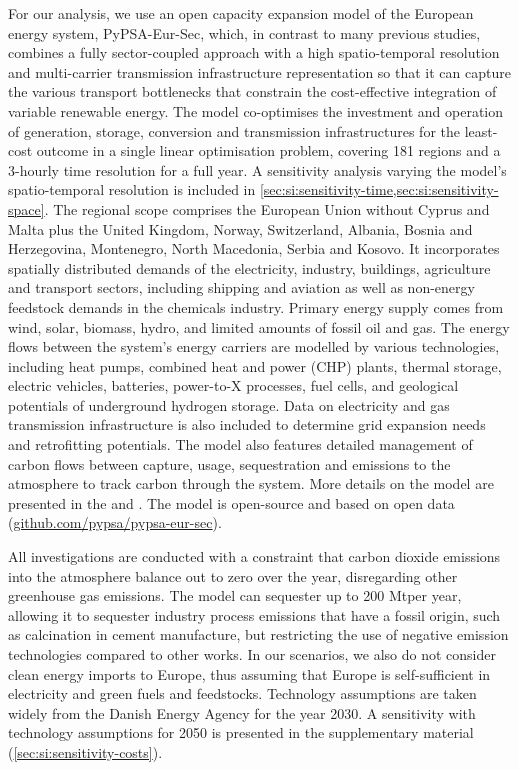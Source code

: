 
For our analysis, we use an open capacity expansion model of the European energy
system, PyPSA-Eur-Sec, which, in contrast to many previous studies,
\cite{henningComprehensiveModel2014,mathiesenSmartEnergy2015,connollySmartEnergy2016,lofflerDesigningModel2017,blancoPotentialHydrogen2018,brownSynergiesSector2018,in-depth_2018,victoria2020}
combines a fully sector-coupled approach with a high spatio-temporal resolution
and multi-carrier transmission infrastructure representation so that it can
capture the various transport bottlenecks that constrain the cost-effective
integration of variable renewable energy. The model co-optimises the investment
and operation of generation, storage, conversion and transmission
infrastructures for the least-cost outcome in a single linear optimisation
problem, covering 181 regions and a 3-hourly time resolution for a full year. A
sensitivity analysis varying the model's spatio-temporal resolution is included
in \cref{sec:si:sensitivity-time,sec:si:sensitivity-space}. The regional
scope comprises the European Union without Cyprus and Malta plus the United
Kingdom, Norway, Switzerland, Albania, Bosnia and Herzegovina, Montenegro, North
Macedonia, Serbia and Kosovo. It incorporates spatially distributed demands of
the electricity, industry, buildings, agriculture and transport sectors,
including shipping and aviation as well as non-energy feedstock demands in the
chemicals industry. Primary energy supply comes from wind, solar, biomass,
hydro, and limited amounts of fossil oil and gas. The energy flows between the
system's energy carriers are modelled by various technologies, including heat
pumps, combined heat and power (CHP) plants, thermal storage, electric vehicles,
batteries, power-to-X processes, fuel cells, and geological potentials of
underground hydrogen storage. Data on electricity and gas transmission
infrastructure is also included to determine grid expansion needs and
retrofitting potentials. The model also features detailed management of carbon
flows between capture, usage, sequestration and emissions to the atmosphere to
track carbon through the system. More details on the model are presented in the
 and . The model is open-source and based
on open data
(\href{https://github.com/pypsa/pypsa-eur-sec}{github.com/pypsa/pypsa-eur-sec}).

All investigations are conducted with a constraint that carbon dioxide emissions
into the atmosphere balance out to zero over the year, disregarding other
greenhouse gas emissions. The model can sequester up to 200 Mt\co per year,
allowing it to sequester industry process emissions that have a fossil origin,
such as calcination in cement manufacture, but restricting the use of negative
emission technologies compared to other works.
\cite{blancoPotentialHydrogen2018} In our scenarios, we also do not consider
clean energy imports to Europe, thus assuming that Europe is self-sufficient in
electricity and green fuels and feedstocks. Technology assumptions are taken
widely from the Danish Energy Agency for the year 2030.\cite{DEA} A sensitivity
with technology assumptions for 2050 is presented in the supplementary material
(\cref{sec:si:sensitivity-costs}).

